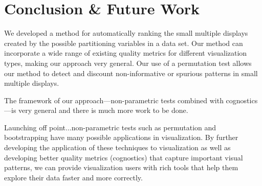 \section{Conclusion \& Future Work}

We developed a method for automatically ranking the small multiple displays created by the possible partitioning variables in a data set. Our method can incorporate a wide range of existing quality metrics for different visualization types, making our approach very general. Our use of a permutation test allows our method to detect and discount non-informative or spurious patterns in small multiple displays.

The framework of our approach---non-parametric tests combined with cognostics---is very general and there is much more work to be done.

Launching off point...non-parametric tests such as permutation and bootstrapping have many possible applications in visualization. By further developing the application of these techniques to visualization as well as developing better quality metrics (cognostics) that capture important visual patterns, we can provide visualization users with rich tools that help them explore their data faster and more correctly.

